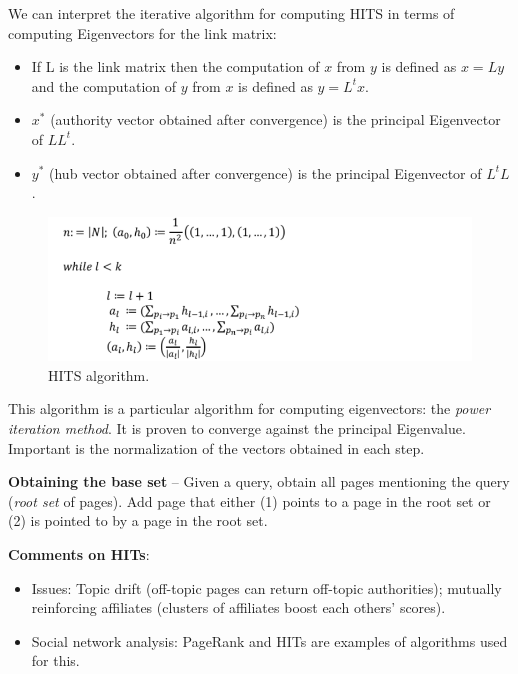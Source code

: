     We can interpret the iterative algorithm for computing HITS in terms of computing Eigenvectors for the link matrix:
    \begin{itemize}
      \item If L is the link matrix then the computation of $x$ from $y$ is defined as $x=Ly$ and the computation of $y$ from $x$ is defined as $y=L^tx$.
      \item $x^*$ (authority vector obtained after convergence) is the principal Eigenvector of $LL^t$.
      \item $y^*$ (hub vector obtained after convergence) is the principal Eigenvector of $L^tL$.
    \end{itemize}


    \begin{figure}[htp]
      \centering
        \includegraphics[width=.65\textwidth]{images/hitsalgo1.png}
        \caption{HITS algorithm.}
        \label{fig:hitsalgo1}
    \end{figure}

    This algorithm is a particular algorithm for computing eigenvectors: the \emph{power iteration method}. It is proven to converge against the principal Eigenvalue. Important is the normalization of the vectors obtained in each step.

    \textbf{Obtaining the base set} -- Given a query, obtain all pages mentioning the query (\emph{root set} of pages). Add page that either (1) points to a page in the root set or (2) is pointed to by a page in the root set.

    \textbf{Comments on HITs}:
    \begin{itemize}
      \item Issues: Topic drift (off-topic pages can return off-topic authorities); mutually reinforcing affiliates (clusters of affiliates boost each others' scores).
      \item Social network analysis: PageRank and HITs are examples of algorithms used for this.
    \end{itemize}


